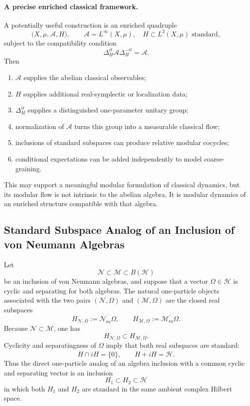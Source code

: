 \documentclass[a4paper,11pt]{article}
\theoremstyle{definition}
\newcommand{\cH}{\mathcal{H}}
\begin{document}
\paragraph{A precise enriched classical framework.}
A potentially useful construction is an enriched quadruple
\[
    \bigl(X,\mu,\mathcal{A},H\bigr),
    \qquad
    \mathcal{A}=L^\infty(X,\mu),
    \quad
    H\subset L^2(X,\mu)
    \text{ standard},
\]
subject to the compatibility condition
\[
    \Delta_H^{it}\mathcal{A}\Delta_H^{-it}=\mathcal{A}.
\]
Then
\begin{enumerate}
    \item \(\mathcal{A}\) supplies the abelian classical observables;
    \item \(H\) supplies additional real-symplectic or localization data;
    \item \(\Delta_H^{it}\) supplies a distinguished one-parameter unitary group;
    \item normalization of \(\mathcal{A}\) turns this group into a measurable classical flow;
    \item inclusions of standard subspaces can produce relative modular cocycles;
    \item conditional expectations can be added independently to model coarse-graining.
\end{enumerate}
This may support a meaningful modular formulation of classical dynamics, but its modular flow is not intrinsic to the abelian algebra. It is modular dynamics of an enriched structure compatible with that algebra.

\subsection*{Standard Subspace Analog of an Inclusion of von Neumann Algebras}

Let
\[
\mathcal{N}\subset \mathcal{M}\subset B(\cH)
\]
be an inclusion of von Neumann algebras, and suppose that a vector
$\Omega\in\cH$ is cyclic and separating for both algebras.  The natural
one-particle objects associated with the two pairs $(\mathcal{N},\Omega)$ and
$(\mathcal{M},\Omega)$ are the closed real subspaces
\[
H_{\mathcal{N},\Omega}
   :=\overline{\mathcal{N}_{\mathrm{sa}}\Omega},
\qquad
H_{\mathcal{M},\Omega}
   :=\overline{\mathcal{M}_{\mathrm{sa}}\Omega}.
\]
Because $\mathcal{N}\subset\mathcal{M}$, one has
\[
H_{\mathcal{N},\Omega}\subset H_{\mathcal{M},\Omega}.
\]
Cyclicity and separatingness of $\Omega$ imply that both real subspaces
are standard:
\[
H\cap iH=\{0\},
\qquad
\overline{H+iH}=\cH.
\]
Thus the direct one-particle analog of an algebra inclusion with a common
cyclic and separating vector is an inclusion
\[
\boxed{H_1\subset H_2\subset\cH}
\]
in which both $H_1$ and $H_2$ are standard in the same ambient complex
Hilbert space.
\end{document}

